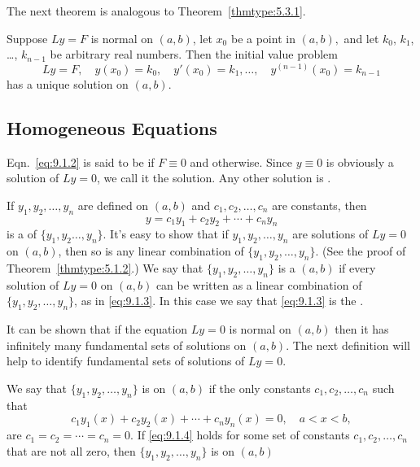 \documentclass{ximera}
\begin{document}
The next theorem is analogous to
Theorem~\ref{thmtype:5.3.1}.

\begin{theorem}\label{thmtype:9.1.1}
Suppose   $Ly=F$ is normal on $(a,b)$, let $x_0$ be a point in
$(a,b),$
and let $k_0$, $k_1$, \dots, $k_{n-1}$ be arbitrary real numbers. Then
the initial value problem
$$
Ly=F, \quad  y(x_0)=k_0,\quad y'(x_0)=k_1,\dots,\quad y^{(n-1)}(x_0)=k_{n-1}
$$
has a unique solution on $(a,b)$.
\end{theorem}

\subsection*{Homogeneous Equations}

Eqn.~\eqref{eq:9.1.2} is said to be  if $F\equiv0$ and  otherwise. Since $y\equiv0$ is obviously a
solution of $Ly=0$, we call it the  solution. Any other
solution is .



If $y_1, y_2, \dots, y_n$ are defined on $(a,b)$ and
$c_1, c_2, \dots, c_n$ are constants, then
\begin{equation}\label{eq:9.1.3}
y=c_1y_1+c_2y_2+\cdots+c_ny_n
\end{equation}
is a  of $\{y_1,y_2\dots,y_n\}$. It's
easy
 to show that if $y_1, y_2, \dots, y_n$ are solutions of
$Ly=0$ on $(a,b)$, then so is any linear combination of
$\{y_1,y_2,\dots,y_n\}$. (See the proof of Theorem~\ref{thmtype:5.1.2}.) We
say that $\{y_1,y_2,\dots,y_n\}$ is a  $(a,b)$ if every solution of $Ly=0$ on
$(a,b)$ can be written as a linear combination of
$\{y_1,y_2,\dots,y_n\}$, as in \eqref{eq:9.1.3}. In this case we say that
\eqref{eq:9.1.3} is the .


It can be shown 
that if
the equation $Ly=0$ is normal on $(a,b)$ then it has
infinitely many fundamental  sets of solutions  on $(a,b)$.
The next definition will help to identify fundamental sets of
solutions of $Ly=0$.

We say that $\{y_1,y_2,\dots,y_n\}$ is  on
$(a,b)$ if the only constants $c_1, c_2, \dots, c_n$ such that
\begin{equation}\label{eq:9.1.4}
c_1y_1(x)+c_2y_2(x)+\cdots+c_ny_n(x)=0,\quad a<x<b,
\end{equation}
are $c_1=c_2=\cdots=c_n=0$. If \eqref{eq:9.1.4} holds for some set of
constants $c_1, c_2, \dots, c_n$ that are not all zero, then
$\{y_1,y_2,\dots,y_n\}$ is  on $(a,b)$
\end{document}
